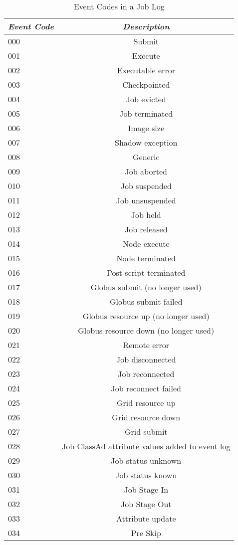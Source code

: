 \begin{center}
\begin{table}[H]
\caption{\label{table:user-log-event-codes}Event Codes in a Job Log}
\begin{tabular}{|l|c|} \hline
\emph{Event Code} & \emph{Description}   \\ \hline \hline
000   &   Submit  \\ \hline
001   &   Execute  \\ \hline
002   &   Executable error  \\ \hline
003   &   Checkpointed  \\ \hline
004   &   Job evicted  \\ \hline
005   &   Job terminated  \\ \hline
006   &   Image size  \\ \hline
007   &   Shadow exception  \\ \hline
008   &   Generic  \\ \hline
009   &   Job aborted  \\ \hline
010  &   Job suspended  \\ \hline
011  &   Job unsuspended  \\ \hline
012  &   Job held  \\ \hline
013  &   Job released  \\ \hline
014  &   Node execute  \\ \hline
015  &   Node terminated  \\ \hline
016  &   Post script terminated  \\ \hline
017  &   Globus submit (no longer used)  \\ \hline
018  &   Globus submit failed  \\ \hline
019  &   Globus resource up (no longer used)  \\ \hline
020  &   Globus resource down (no longer used)  \\ \hline
021  &   Remote error  \\ \hline
022  &   Job disconnected  \\ \hline
023  &   Job reconnected  \\ \hline
024  &   Job reconnect failed  \\ \hline
025  &   Grid resource up \\ \hline
026  &   Grid resource down \\ \hline
027  &   Grid submit \\ \hline
028  &   Job ClassAd attribute values added to event log  \\ \hline
029  &   Job status unknown \\ \hline
030  &   Job status known \\ \hline
031  &   Job Stage In \\ \hline
032  &   Job Stage Out \\ \hline
033  &   Attribute update \\ \hline
034  &   Pre Skip \\ \hline
\end{tabular}
\end{table}
\end{center}


